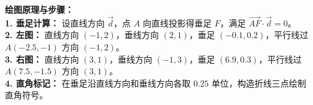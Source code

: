 \vspace{0.4cm}
{\small\color{blue!70!black}
\textbf{绘图原理与步骤：}\\
\textbf{1. 垂足计算：} 设直线方向 $\vec{d}$，点 $A$ 向直线投影得垂足 $F$，满足 $\overrightarrow{AF} \cdot \vec{d} = 0$。\\
\textbf{2. 左图：} 直线方向 $(-1,2)$，垂线方向 $(2,1)$，垂足 $(-0.1, 0.2)$，平行线过 $A(-2.5,-1)$ 方向 $(-1,2)$。\\
\textbf{3. 右图：} 直线方向 $(3,1)$，垂线方向 $(-1,3)$，垂足 $(6.9, 0.3)$，平行线过 $A(7.5,-1.5)$ 方向 $(3,1)$。\\
\textbf{4. 直角标记：} 在垂足沿直线方向和垂线方向各取 $0.25$ 单位，构造折线三点绘制直角符号。
}

\newpage


